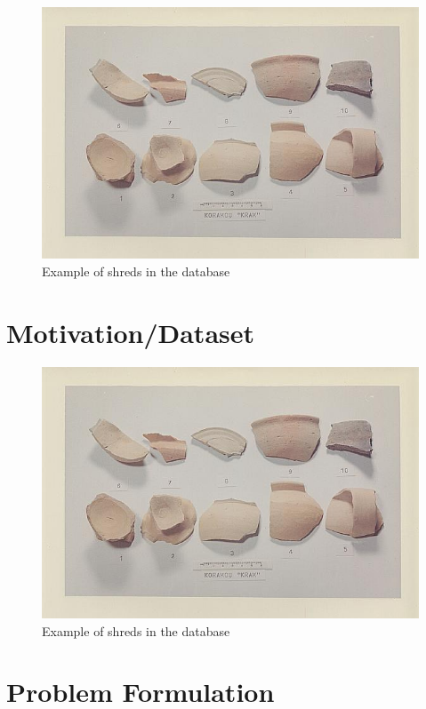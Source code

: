 \documentclass[10pt,a4paper]{article}
\begin{document}
\begin{figure}
\includegraphics[width=\textwidth]{korakou}
\caption{Example of shreds in the database}
\label{fig:sample}
\end{figure}






\section{Motivation/Dataset}


\begin{figure}
\includegraphics[width=\textwidth]{korakou}
\caption{Example of shreds in the database}
\label{fig:sample}
\end{figure}

\section{Problem Formulation}

\end{document}
